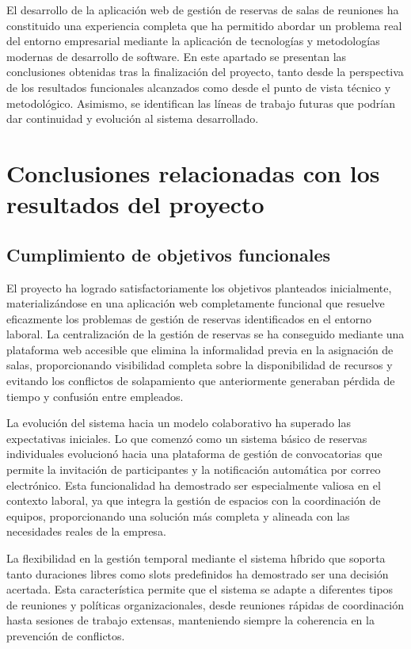 
El desarrollo de la aplicación web de gestión de reservas de salas de reuniones ha constituido una experiencia completa que ha permitido abordar un problema real del entorno empresarial mediante la aplicación de tecnologías y metodologías modernas de desarrollo de software. En este apartado se presentan las conclusiones obtenidas tras la finalización del proyecto, tanto desde la perspectiva de los resultados funcionales alcanzados como desde el punto de vista técnico y metodológico. Asimismo, se identifican las líneas de trabajo futuras que podrían dar continuidad y evolución al sistema desarrollado.

\section{Conclusiones relacionadas con los resultados del proyecto}\label{conclusiones-relacionadas-resultados-proyecto}
\subsection{Cumplimiento de objetivos funcionales}\label{cumplimiento-objetivos-funcionales}
El proyecto ha logrado satisfactoriamente los objetivos planteados inicialmente, materializándose en una aplicación web completamente funcional que resuelve eficazmente los problemas de gestión de reservas identificados en el entorno laboral. La centralización de la gestión de reservas se ha conseguido mediante una plataforma web accesible que elimina la informalidad previa en la asignación de salas, proporcionando visibilidad completa sobre la disponibilidad de recursos y evitando los conflictos de solapamiento que anteriormente generaban pérdida de tiempo y confusión entre empleados.

La evolución del sistema hacia un modelo colaborativo ha superado las expectativas iniciales. Lo que comenzó como un sistema básico de reservas individuales evolucionó hacia una plataforma de gestión de convocatorias que permite la invitación de participantes y la notificación automática por correo electrónico. Esta funcionalidad ha demostrado ser especialmente valiosa en el contexto laboral, ya que integra la gestión de espacios con la coordinación de equipos, proporcionando una solución más completa y alineada con las necesidades reales de la empresa.

La flexibilidad en la gestión temporal mediante el sistema híbrido que soporta tanto duraciones libres como slots predefinidos ha demostrado ser una decisión acertada. Esta característica permite que el sistema se adapte a diferentes tipos de reuniones y políticas organizacionales, desde reuniones rápidas de coordinación hasta sesiones de trabajo extensas, manteniendo siempre la coherencia en la prevención de conflictos.

